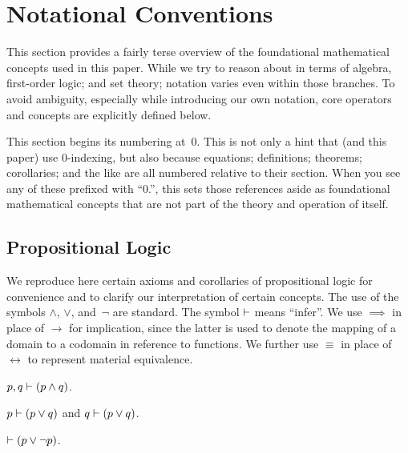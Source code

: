 
\section{Notational Conventions}
This section provides a fairly terse overview of the foundational
  mathematical concepts used in this paper.
While we try to reason about \tame{} in terms of algebra,
  first-order logic;
  and set theory;
    notation varies even within those branches.
To avoid ambiguity,
  especially while introducing our own notation,
  core operators and concepts are explicitly defined below.

This section begins its numbering at~0.
This is not only a hint that \tame{} (and this paper) use 0-indexing,
  but also because equations; definitions; theorems; corollaries; and the
  like are all numbered relative to their section.
When you see any of these prefixed with ``0.'',
  this sets those references aside as foundational mathematical concepts
    that are not part of the theory and operation of \tame{} itself.


\subsection{Propositional Logic}
We reproduce here certain axioms and corollaries of propositional logic for
  convenience and to clarify our interpretation of certain concepts.
The use of the symbols $\land$, $\lor$, and~$\neg$ are standard.
\indexsym{}
The symbol $\vdash$ means ``infer''.
We use $\implies$ in place of $\rightarrow$ for implication,
  since the latter is used to denote the mapping of a domain to a codomain
  in reference to functions.
We further use $\equiv$ in place of $\leftrightarrow$ to represent material
  equivalence.

\indexsym{}
\begin{definition}
  $p,q \vdash (p\land q)$.
\end{definition}

\indexsym{}
\begin{definition}
  $p \vdash (p\lor q)$ and $q \vdash (p\lor q)$.
\end{definition}

\indexsym{}
\begin{definition}
  $\vdash (p \lor \neg p)$.
\end{definition}

